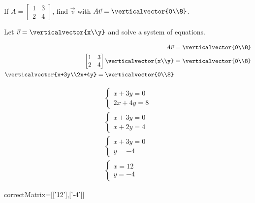 \documentclass{ximera}
\begin{document}
\begin{question}
  If $A = \begin{bmatrix} 1 &3\\2&4\end{bmatrix} $, find $\vec{v}$ with $A\vec{v} = \verticalvector{0\\8}$.
  \begin{solution}
  \begin{hint}
  	Let $\vec{v} = \verticalvector{x\\y}$ and solve a system of equations.
  \end{hint}
  \begin{hint}
  	\begin{align*}
  		A\vec{v} &= \verticalvector{0\\8}\\
  		\begin{bmatrix} 1 &3\\2&4\end{bmatrix}\verticalvector{x\\y} &= \verticalvector{0\\8}\\
  		\verticalvector{x+3y\\2x+4y} = \verticalvector{0\\8}
  	\end{align*}
  \end{hint}
  \begin{hint}
	\begin{align*}
    \begin{cases}
  			x+3y = 0\\
  			2x+4y=8
  		\end{cases}
  		\\
  		\begin{cases}
  			x+3y = 0\\
  			x+2y=4
  		\end{cases}
  		\\
  		\begin{cases}
  			x+3y = 0\\
  			y=-4
  		\end{cases}
  		\\
  		\begin{cases}
  			x=12\\
  			y=-4
  		\end{cases}
\end{align*}
 \end{hint}
  	\begin{matrix-answer}[name=v]
  		correctMatrix=[['12'],['-4']]
  	\end{matrix-answer}
  \end{solution}
\end{question}
	
\end{document}
